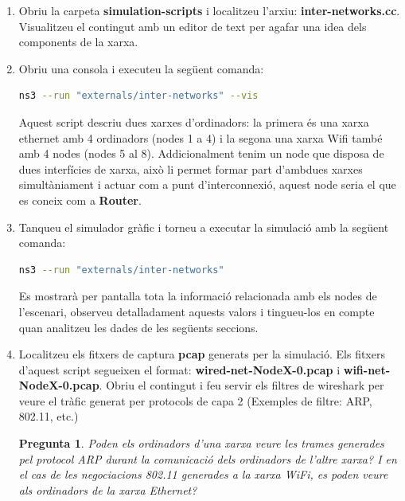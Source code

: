 \documentclass[12pt,a4paper]{article}
\newcounter{exercises}
\newtheorem{exer}[exercises]{Pregunta}
\begin{document}
\begin{enumerate} 
 \item Obriu la carpeta \textbf{simulation-scripts} i localitzeu l'arxiu: \textbf{inter-networks.cc}. Visualitzeu el contingut amb un editor de text per agafar una idea dels components de la xarxa.
  
\item Obriu una consola i executeu la següent comanda:
\begin{lstlisting}[language=bash]
   ns3 --run "externals/inter-networks" --vis
\end{lstlisting}

Aquest script descriu dues xarxes d'ordinadors: la primera és una xarxa ethernet amb 4 ordinadors (nodes 1 a 4) i la segona una xarxa Wifi també amb 4 nodes (nodes 5 al 8).
Addicionalment tenim un node que disposa de dues interfícies de xarxa, això li permet formar part d'ambdues xarxes simultàniament i actuar com a punt d'interconnexió, aquest node seria el que es coneix com a \textbf{Router}.


\item Tanqueu el simulador gràfic i torneu a executar la simulació amb la següent comanda:
\begin{lstlisting}[language=bash]
   ns3 --run "externals/inter-networks"
\end{lstlisting}
Es mostrarà per pantalla tota la informació relacionada amb els nodes de l'escenari, observeu
detalladament aquests valors i tingueu-los en compte quan analitzeu les dades de les següents seccions.

\item Localitzeu els fitxers de captura \textbf{pcap} generats per la simulació. Els fitxers d'aquest script segueixen el format: \textbf{wired-net-NodeX-0.pcap} i \textbf{wifi-net-NodeX-0.pcap}.
Obriu el contingut i feu servir els filtres de wireshark per veure el tràfic generat per protocols de capa 2 (Exemples de filtre: ARP, 802.11, etc.)

\begin{exer} Poden els ordinadors d'una xarxa veure les trames generades pel protocol ARP durant la comunicació dels ordinadors de l'altre xarxa? I en el cas de les negociacions 802.11 generades a la xarxa WiFi, es poden veure als ordinadors de la xarxa Ethernet?\end{exer}


\end{enumerate}
\end{document}
